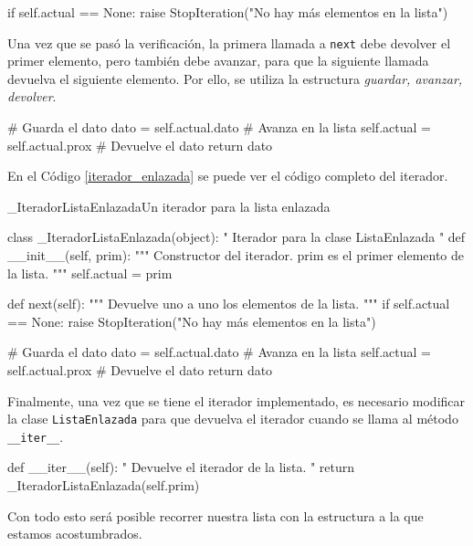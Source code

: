 \begin{codigo-python-sn}
        if self.actual == None:
            raise StopIteration("No hay más elementos en la lista")
\end{codigo-python-sn}

Una vez que se pasó la verificación, la primera llamada a \lstinline!next!
debe devolver el primer elemento, pero también debe avanzar, para que la
siguiente llamada devuelva el siguiente elemento.  Por ello, se utiliza la
estructura {\it guardar, avanzar, devolver}.

\begin{codigo-python-sn}
        # Guarda el dato
        dato = self.actual.dato
        # Avanza en la lista
        self.actual = self.actual.prox
        # Devuelve el dato
        return dato
\end{codigo-python-sn}

En el Código \ref{iterador_enlazada} se puede ver el código completo del
iterador.

\begin{codigo}{\_IteradorListaEnlazada}{Un iterador para la lista enlazada}
\label{iterador_enlazada}
\begin{codigo-python}
class _IteradorListaEnlazada(object):
    " Iterador para la clase ListaEnlazada "
    def __init__(self, prim):
        """ Constructor del iterador.
            prim es el primer elemento de la lista. """
        self.actual = prim

    def next(self):
        """ Devuelve uno a uno los elementos de la lista. """
        if self.actual == None:
            raise StopIteration("No hay más elementos en la lista")

        # Guarda el dato
        dato = self.actual.dato
        # Avanza en la lista
        self.actual = self.actual.prox
        # Devuelve el dato
        return dato
\end{codigo-python}
\end{codigo}

Finalmente, una vez que se tiene el iterador implementado, es necesario
modificar la clase \lstinline!ListaEnlazada! para que devuelva el iterador
cuando se llama al método \lstinline!__iter__!.

\begin{codigo-python-sn}
    def __iter__(self):
        " Devuelve el iterador de la lista. "
        return _IteradorListaEnlazada(self.prim)
\end{codigo-python-sn}

Con todo esto será posible recorrer nuestra lista con la estructura a la
que estamos acostumbrados.

